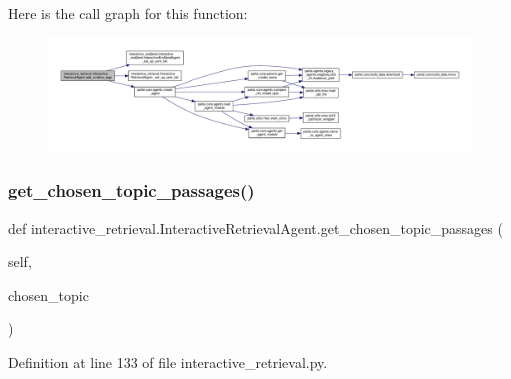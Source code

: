 Here is the call graph for this function\+:
\nopagebreak
\begin{figure}[H]
\begin{center}
\leavevmode
\includegraphics[width=350pt]{classinteractive__retrieval_1_1InteractiveRetrievalAgent_aee00317227b637f9ef4240369575f7ac_cgraph}
\end{center}
\end{figure}
\mbox{\label{classinteractive__retrieval_1_1InteractiveRetrievalAgent_a89ffcbffdda3d20c82ef7ee65ab63461}} 
\subsubsection{\texorpdfstring{get\+\_\+chosen\+\_\+topic\+\_\+passages()}{get\_chosen\_topic\_passages()}}
{\footnotesize\ttfamily def interactive\+\_\+retrieval.\+Interactive\+Retrieval\+Agent.\+get\+\_\+chosen\+\_\+topic\+\_\+passages (\begin{DoxyParamCaption}\item[{}]{self,  }\item[{}]{chosen\+\_\+topic }\end{DoxyParamCaption})}



Definition at line 133 of file interactive\+\_\+retrieval.\+py.



